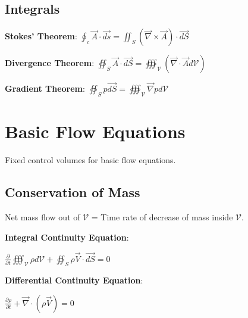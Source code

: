 \documentclass{article}
\begin{document}
\begin{multicols*}{3}
\subsection*{Integrals}
\textbf{Stokes' Theorem}: $\oint_c \vec{A}\cdot\vec{ds}=\iint_S(\vec{\nabla}\times\vec{A})\cdot\vec{dS}$\par 
\textbf{Divergence Theorem}: $\oiint_S\vec{A}\cdot\vec{dS}=\oiiint_\mathcal{V}(\vec{\nabla}\cdot\vec{A}d\mathcal{V})$\par 
\textbf{Gradient Theorem}: $\oiint_S p\vec{dS}=\oiiint_\mathcal{V} \vec{\nabla}pd\mathcal{V}$

\section*{Basic Flow Equations}
Fixed control volumes for basic flow equations.\par 
\subsection*{Conservation of Mass}
Net mass flow out of $\mathcal{V}$ = Time rate of decrease of mass inside $\mathcal{V}$.\par 
\textbf{Integral Continuity Equation}:\par 
$\frac{\partial}{\partial t}\oiiint_\mathcal{V}\rho d\mathcal{V}+\oiint_S\rho\vec{V}\cdot\vec{dS}=0$\par
\textbf{Differential Continuity Equation}:\par
$\frac{\partial\rho}{\partial t}+\vec{\nabla}\cdot(\rho\vec{V})=0$


\end{multicols*}
\end{document}
